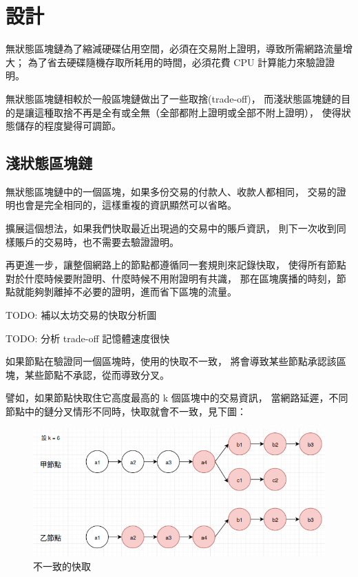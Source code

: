 \graphicspath{ {./images/} }
\chapter{設計}
\label{c:design}

{\color{red}
無狀態區塊鏈為了縮減硬碟佔用空間，必須在交易附上證明，導致所需網路流量增大；
為了省去硬碟隨機存取所耗用的時間，必須花費 CPU 計算能力來驗證證明。

無狀態區塊鏈相較於一般區塊鏈做出了一些取捨(trade-off)，
而淺狀態區塊鏈的目的是讓這種取捨不再是全有或全無（全部都附上證明或全部不附上證明），
使得狀態儲存的程度變得可調節。
}

\section{淺狀態區塊鏈}

{\color{red}
無狀態區塊鏈中的一個區塊，如果多份交易的付款人、收款人都相同，
交易的證明也會是完全相同的，這樣重複的資訊顯然可以省略。

擴展這個想法，如果我們快取最近出現過的交易中的賬戶資訊，
則下一次收到同樣賬戶的交易時，也不需要去驗證證明。

再更進一步，讓整個網路上的節點都遵循同一套規則來記錄快取，
使得所有節點對於什麼時候要附證明、什麼時候不用附證明有共識，
那在區塊廣播的時刻，節點就能夠剝離掉不必要的證明，進而省下區塊的流量。
}

TODO: 補以太坊交易的快取分析圖

TODO: 分析 trade-off 記憶體速度很快

如果節點在驗證同一個區塊時，使用的快取不一致，
將會導致某些節點承認該區塊，某些節點不承認，從而導致分叉。

譬如，如果節點快取住它高度最高的 k 個區塊中的交易資訊，
當網路延遲，不同節點中的鏈分叉情形不同時，快取就會不一致，見下圖：

\begin{figure}[h]
\includegraphics[width=\textwidth]{wrong-cache}
\caption{不一致的快取}
\end{figure}


